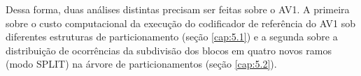 Dessa forma, duas análises distintas precisam ser feitas sobre o AV1. A primeira sobre o custo computacional da execução do codificador de referência do AV1 sob diferentes estruturas de particionamento (seção \ref{cap:5.1}) e a segunda sobre a distribuição de ocorrências da subdivisão dos blocos em quatro novos ramos (modo SPLIT) na árvore de particionamentos (seção \ref{cap:5.2}).


